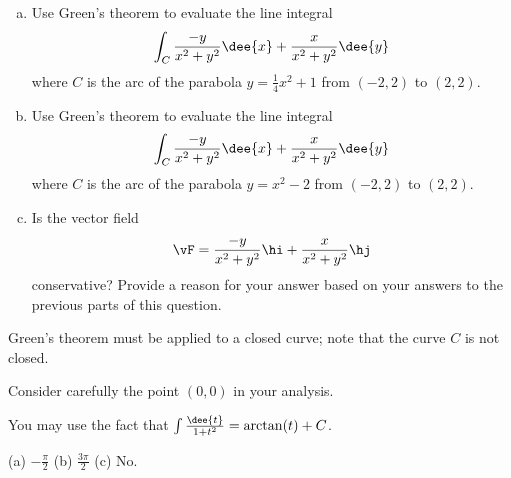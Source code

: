 \begin{question}[M317 2015A]  %
\begin{enumerate}[(a)]
\item
Use Green's theorem to evaluate the line integral
\begin{equation*}
\int_C \frac{-y}{x^2+y^2}\dee{x} + \frac{x}{x^2+y^2}\dee{y}
\end{equation*}
where $C$ is the arc of the parabola $y = \frac{1}{4}x^2 + 1$ from
$(-2, 2)$ to $(2, 2)$.


\item
Use Green's theorem to evaluate the line integral
\begin{equation*}
\int_C \frac{-y}{x^2+y^2}\dee{x} + \frac{x}{x^2+y^2}\dee{y}
\end{equation*}
where $C$ is the arc of the parabola $y = x^2 -2$ from
$(-2, 2)$ to $(2, 2)$.


\item
Is the vector field
\begin{equation*}
\vF=\frac{-y}{x^2+y^2}\hi + \frac{x}{x^2+y^2}\hj
\end{equation*}
conservative? Provide a reason for your answer based on your answers
to the previous parts of this question.
\end{enumerate}

\end{question}

\begin{hint}
Green's theorem must be applied to a closed curve; note that the
curve $C$ is not closed.

Consider carefully the point $(0, 0)$ in your analysis.

You may use the fact that
$\int \frac{\dee{t}}{1+t^2} = \arctan(t) + C$.
\end{hint}

\begin{answer}
(a) $-\frac{\pi}{2}$\qquad
(b) $\frac{3\pi}{2}$\qquad
(c) No.
\end{answer}

